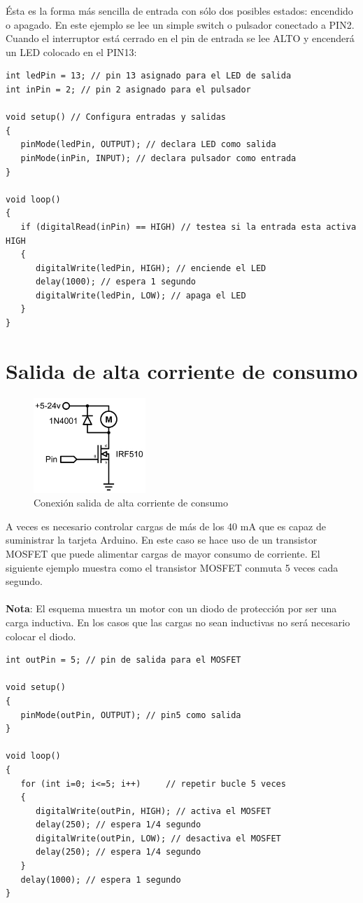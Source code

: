 Ésta es la forma más sencilla de entrada con sólo dos posibles estados: encendido o apagado. En este ejemplo se lee un simple switch o pulsador conectado a PIN2. Cuando el interruptor está cerrado en el pin de entrada se lee ALTO y encenderá un LED colocado en el PIN13:
\begin{lstlisting}
int ledPin = 13; // pin 13 asignado para el LED de salida
int inPin = 2; // pin 2 asignado para el pulsador

void setup() // Configura entradas y salidas
{
   pinMode(ledPin, OUTPUT); // declara LED como salida
   pinMode(inPin, INPUT); // declara pulsador como entrada
}

void loop()
{
   if (digitalRead(inPin) == HIGH) // testea si la entrada esta activa HIGH
   {
      digitalWrite(ledPin, HIGH); // enciende el LED
      delay(1000); // espera 1 segundo
      digitalWrite(ledPin, LOW); // apaga el LED
   }
}
\end{lstlisting}
\newpage{}
\section{Salida de alta corriente de consumo}
\begin{figure}[!htp]
	\centering
	\includegraphics[width=120pt]{./Imagenes/Documentos/ArduinoNotebook_img03.png}
	\caption[Conexión salida de alta corriente de consumo]{Conexión salida de alta corriente de consumo}
\end{figure}

A veces es necesario controlar cargas de más de los 40 mA que es capaz de suministrar la tarjeta Arduino. En este caso se hace uso de un transistor MOSFET que puede alimentar cargas de mayor consumo de corriente. El siguiente ejemplo muestra como el transistor MOSFET conmuta 5 veces cada segundo.\\\\
\textbf{Nota}: El esquema muestra un motor con un diodo de protección por ser una carga inductiva. En los casos que las cargas no sean inductivas no será necesario colocar el diodo.
\begin{lstlisting}
int outPin = 5; // pin de salida para el MOSFET

void setup()
{
   pinMode(outPin, OUTPUT); // pin5 como salida
}

void loop()
{
   for (int i=0; i<=5; i++)     // repetir bucle 5 veces
   {
      digitalWrite(outPin, HIGH); // activa el MOSFET
      delay(250); // espera 1/4 segundo
      digitalWrite(outPin, LOW); // desactiva el MOSFET
      delay(250); // espera 1/4 segundo
   }
   delay(1000); // espera 1 segundo
}
\end{lstlisting}

